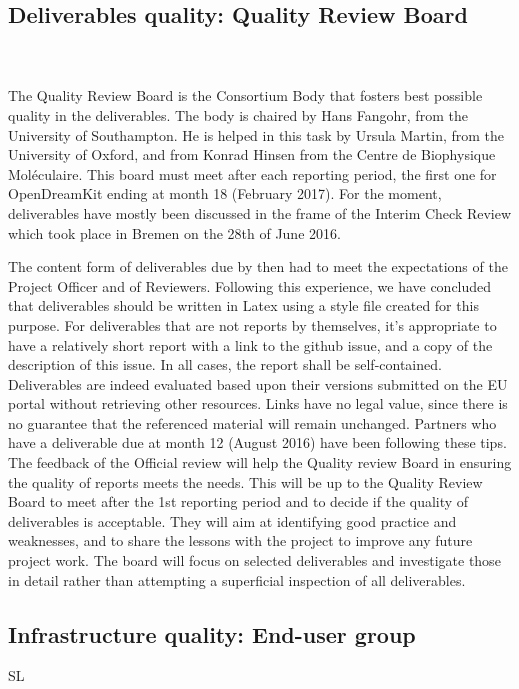 \documentclass{deliverablereport}
\begin{document}
\subsection{Deliverables quality: Quality Review Board}
 ~\\~\\
The Quality Review Board is the Consortium Body that fosters best
possible quality in the deliverables.
The body is chaired by Hans Fangohr, from the University of Southampton. He is helped in this task by Ursula Martin, from the University of Oxford, and from Konrad Hinsen from the Centre de Biophysique Moléculaire. This board must meet after each reporting period, the first one for OpenDreamKit ending at month 18 (February 2017).
For the moment, deliverables have mostly been discussed in the frame of the Interim Check Review which took place in Bremen on the 28th of June 2016.


The content form of deliverables due by then had to meet the expectations of the Project Officer and of Reviewers. Following this experience, we have concluded that deliverables should be written in Latex using a style file created for this purpose. For deliverables that are not reports by themselves, it's appropriate to have a relatively short report with a link to the github issue, and a copy of the description of this issue. In all cases, the report shall be self-contained. Deliverables are indeed evaluated based upon their versions submitted on the EU portal without retrieving other resources. Links have no legal value, since there is no guarantee that the referenced material will remain unchanged.
Partners who have a deliverable due at month 12 (August 2016) have been following these tips. The feedback of the Official review will help the Quality review Board in ensuring the quality of reports meets the needs. This will be up to the Quality Review Board to meet after the 1st reporting period and to decide if the quality of deliverables is acceptable.
They will aim at identifying good practice and weaknesses, and to share the lessons with the project to improve any future project work. The board will focus on selected deliverables and investigate those in detail rather than attempting a superficial inspection of all deliverables.


\subsection{Infrastructure quality: End-user group}

SL
\end{document}
